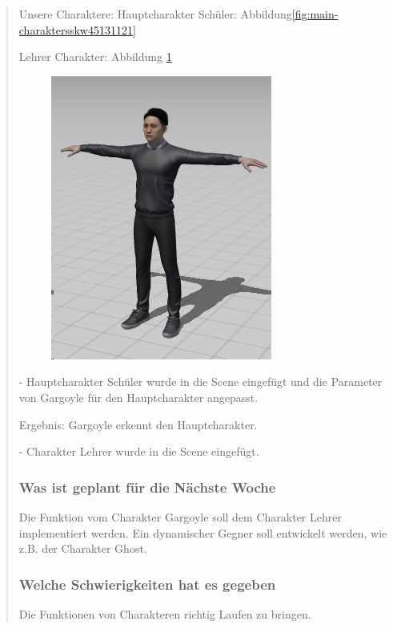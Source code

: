 \begin{quote}
	 Unsere Charaktere: Hauptcharakter Schüler: Abbildung\ref{fig:main-charaktersskw45131121}
	 
	 Lehrer Charakter: Abbildung \ref{fig:lehrercharakterss151121}
	 \begin{figure}
	 \centering
	 \includegraphics[width=0.3\linewidth]{img/SemihSoenmez_IMG/LehrerCharakter_SS_151121}
	 \caption{}
	 \label{fig:lehrercharakterss151121}
	 \end{figure}
	 					
	 					
	- Hauptcharakter Schüler wurde in die Scene eingefügt und die Parameter von Gargoyle für den Hauptcharakter angepasst.
	
	Ergebnis: Gargoyle erkennt den Hauptcharakter.
	
	- Charakter Lehrer wurde in die Scene eingefügt.
	
	
	
	\subsubsection*{Was ist geplant für die Nächste Woche}
	Die Funktion vom Charakter Gargoyle soll dem Charakter Lehrer implementiert werden.
	Ein dynamischer Gegner soll entwickelt werden, wie z.B. der Charakter Ghost.
	
	\subsubsection*{Welche Schwierigkeiten hat es gegeben}
	Die Funktionen von Charakteren richtig Laufen zu bringen.
	
\end{quote}

